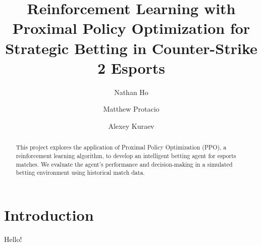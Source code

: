 \documentclass[sigconf]{acmart}
\title{Reinforcement Learning with Proximal Policy Optimization for Strategic Betting in Counter-Strike 2 Esports}
\author{Nathan Ho}
\affiliation{%
  \institution{Drexel University}
  \city{Philadelphia}
  \state{PA}
  \country{USA}
}
\author{Matthew Protacio}
\affiliation{%
  \institution{Drexel University}
  \city{Philadelphia}
  \state{PA}
  \country{USA}
}
\author{Alexey Kuraev}
\affiliation{%
  \institution{Drexel University}
  \city{Philadelphia}
  \state{PA}
  \country{USA}
}
\begin{document}
\maketitle

\begin{abstract}
This project explores the application of Proximal Policy Optimization (PPO), a reinforcement learning algorithm, to develop an intelligent betting agent for esports matches. We evaluate the agent's performance and decision-making in a simulated betting environment using historical match data.
\end{abstract}


\section{Introduction}
Hello!
\end{document}

